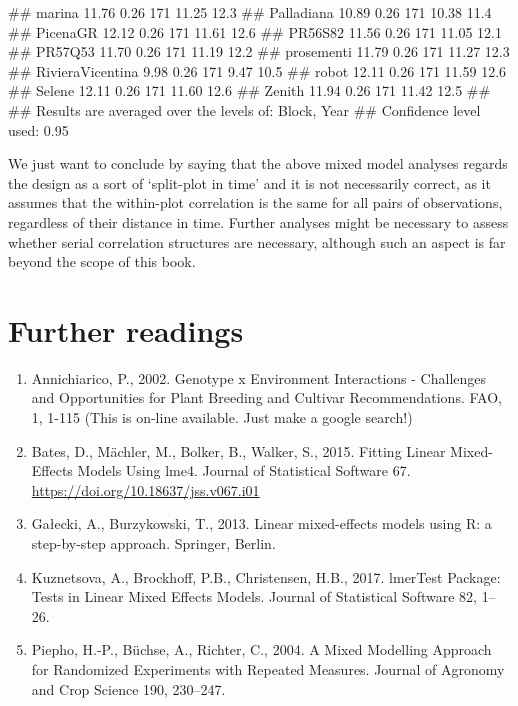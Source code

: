 \documentclass[a4paper,12pt,oneside]{book}
\providecommand{\tightlist}{%
  \setlength{\itemsep}{0pt}\setlength{\parskip}{0pt}}
\newenvironment{Shaded}{\begin{snugshade}}{\end{snugshade}}
\newcommand{\DocumentationTok}[1]{#1}
\begin{document}
\begin{Shaded}
\begin{Highlighting}[]
\DocumentationTok{\#\#  marina             11.76 0.26 171    11.25     12.3}
\DocumentationTok{\#\#  Palladiana         10.89 0.26 171    10.38     11.4}
\DocumentationTok{\#\#  PicenaGR           12.12 0.26 171    11.61     12.6}
\DocumentationTok{\#\#  PR56S82            11.56 0.26 171    11.05     12.1}
\DocumentationTok{\#\#  PR57Q53            11.70 0.26 171    11.19     12.2}
\DocumentationTok{\#\#  prosementi         11.79 0.26 171    11.27     12.3}
\DocumentationTok{\#\#  RivieraVicentina    9.98 0.26 171     9.47     10.5}
\DocumentationTok{\#\#  robot              12.11 0.26 171    11.59     12.6}
\DocumentationTok{\#\#  Selene             12.11 0.26 171    11.60     12.6}
\DocumentationTok{\#\#  Zenith             11.94 0.26 171    11.42     12.5}
\DocumentationTok{\#\# }
\DocumentationTok{\#\# Results are averaged over the levels of: Block, Year }
\DocumentationTok{\#\# Confidence level used: 0.95}
\end{Highlighting}
\end{Shaded}

We just want to conclude by saying that the above mixed model analyses regards the design as a sort of `split-plot in time' and it is not necessarily correct, as it assumes that the within-plot correlation is the same for all pairs of observations, regardless of their distance in time. Further analyses might be necessary to assess whether serial correlation structures are necessary, although such an aspect is far beyond the scope of this book.

\hypertarget{further-readings-10}{%
\section{Further readings}\label{further-readings-10}}

\begin{enumerate}
\def\labelenumi{\arabic{enumi}.}
\tightlist
\item
  Annichiarico, P., 2002. Genotype x Environment Interactions - Challenges and Opportunities for Plant Breeding and Cultivar Recommendations. FAO, 1, 1-115 (This is on-line available. Just make a google search!)
\item
  Bates, D., Mächler, M., Bolker, B., Walker, S., 2015. Fitting Linear Mixed-Effects Models Using lme4. Journal of Statistical Software 67. \url{https://doi.org/10.18637/jss.v067.i01}
\item
  Gałecki, A., Burzykowski, T., 2013. Linear mixed-effects models using R: a step-by-step approach. Springer, Berlin.
\item
  Kuznetsova, A., Brockhoff, P.B., Christensen, H.B., 2017. lmerTest Package: Tests in Linear Mixed Effects Models. Journal of Statistical Software 82, 1--26.
\item
  Piepho, H.-P., Büchse, A., Richter, C., 2004. A Mixed Modelling Approach for Randomized Experiments with Repeated Measures. Journal of Agronomy and Crop Science 190, 230--247.
\end{enumerate}
\end{document}
